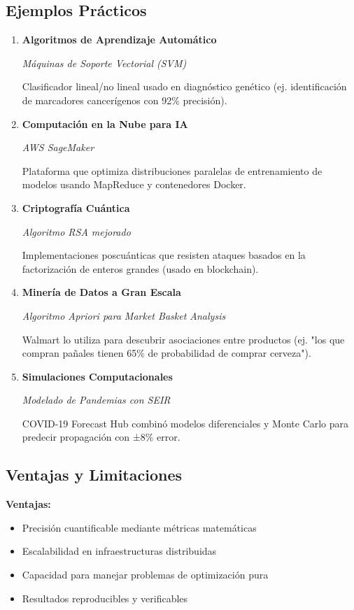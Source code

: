 \documentclass[14pt]{extarticle}
\begin{document}
  \subsection*{Ejemplos Prácticos}
  \begin{enumerate}
    \item \textbf{Algoritmos de Aprendizaje Automático}
    
      \textit{Máquinas de Soporte Vectorial (SVM)}
    
      Clasificador lineal/no lineal usado en diagnóstico genético (ej. identificación de marcadores cancerígenos con 92\% precisión).

    \item \textbf{Computación en la Nube para IA}
    
      \textit{AWS SageMaker}
    
      Plataforma que optimiza distribuciones paralelas de entrenamiento de modelos usando MapReduce y contenedores Docker.

    \item \textbf{Criptografía Cuántica}
    
      \textit{Algoritmo RSA mejorado}
    
      Implementaciones poscuánticas que resisten ataques basados en la factorización de enteros grandes (usado en blockchain).

    \item \textbf{Minería de Datos a Gran Escala}
    
      \textit{Algoritmo Apriori para Market Basket Analysis}
    
      Walmart lo utiliza para descubrir asociaciones entre productos (ej. "los que compran pañales tienen 65\% de probabilidad de comprar cerveza").

    \item \textbf{Simulaciones Computacionales}
    
      \textit{Modelado de Pandemias con SEIR}
    
      COVID-19 Forecast Hub combinó modelos diferenciales y Monte Carlo para predecir propagación con ±8\% error.
  \end{enumerate}

  \subsection*{Ventajas y Limitaciones}

  \textbf{Ventajas:}
  \begin{itemize}
    \item Precisión cuantificable mediante métricas matemáticas
    \item Escalabilidad en infraestructuras distribuidas
    \item Capacidad para manejar problemas de optimización pura
    \item Resultados reproducibles y verificables
  \end{itemize}
\end{document}
